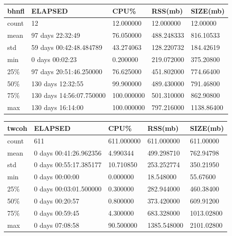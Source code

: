 \documentclass{article}
\begin{document}
\begin{tabular}{|l|l|l|l|l|}
\hline 
\hline bhnfl&    ELAPSED&   CPU\%&   RSS(mb)&   SIZE(mb) \\
\hline count&    12&  12.000000&  12.000000&  12.00000 \\
\hline mean&   97 days 22:32:49&  76.050000& 488.248333&  816.10533 \\
\hline std&   59 days 00:42:48.484789&  43.274063& 128.220732&  184.42619 \\
\hline min&    0 days 00:02:23&  0.200000& 219.072000&  375.20800 \\
\hline 25\%&   97 days 20:51:46.250000&  76.625000& 451.802000&  774.66400 \\
\hline 50\%&   130 days 12:32:55&  99.900000& 489.430000&  791.46800 \\
\hline 75\%&  130 days 14:56:07.750000& 100.000000& 501.310000&  862.90800 \\
\hline max&   130 days 16:14:00& 100.000000& 797.216000& 1138.86400 \\
\hline 
\end{tabular}
 
\begin{tabular}{|l|l|l|l|l|}
\hline 
\hline twcoh& ELAPSED&   CPU\%&  RSS(mb)&   SIZE(mb) \\
\hline count&    611& 611.000000&  611.000000&  611.00000 \\
\hline mean&  0 days 00:41:26.962356&  4.990344&  499.298710&  762.94798 \\
\hline std&  0 days 00:55:17.385177&  10.710850&  253.252774&  350.21950 \\
\hline min&   0 days 00:00:00&  0.000000&  18.548000&  55.67600 \\
\hline 25\%&  0 days 00:03:01.500000&  0.300000&  282.944000&  460.38400 \\
\hline 50\%&   0 days 00:20:57&  0.800000&  373.420000&  609.91200 \\
\hline 75\%&   0 days 00:59:45&  4.300000&  683.328000& 1013.02800 \\
\hline max&   0 days 07:08:58&  90.500000& 1385.548000& 2101.02800 \\
\hline 
\end{tabular}
 
\end{document}
